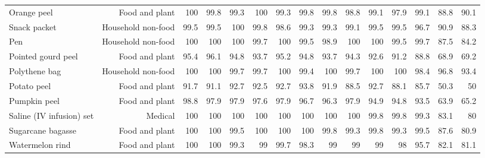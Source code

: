 \begin{table}[!htbp]
\begin{adjustbox}{max width=\textwidth}
\begin{tabular}{@{}lrrrrrrrrrrrrrr@{}}
Orange peel & Food and plant & 100 & 99.8 & 99.3 & 100 & 99.3 & 99.8 & 99.8 & 98.8 & 99.1 & 97.9 & 99.1 & 88.8 & 90.1 \\
Snack packet & Household non-food & 99.5 & 99.5 & 100 & 99.8 & 98.6 & 99.3 & 99.3 & 99.1 & 99.5 & 99.5 & 96.7 & 90.9 & 88.3 \\
Pen & Household non-food & 100 & 100 & 100 & 99.7 & 100 & 99.5 & 98.9 & 100 & 100 & 99.5 & 99.7 & 87.5 & 84.2 \\
Pointed gourd peel & Food and plant & 95.4 & 96.1 & 94.8 & 93.7 & 95.2 & 94.8 & 93.7 & 94.3 & 92.6 & 91.2 & 88.8 & 68.9 & 69.2 \\
Polythene bag & Household non-food & 100 & 100 & 99.7 & 99.7 & 100 & 99.4 & 100 & 99.7 & 100 & 100 & 98.4 & 96.8 & 93.4 \\
Potato peel & Food and plant & 91.7 & 91.1 & 92.7 & 92.5 & 92.7 & 93.8 & 91.9 & 88.5 & 92.7 & 88.1 & 85.7 & 50.3 & 50 \\
Pumpkin peel & Food and plant & 98.8 & 97.9 & 97.9 & 97.6 & 97.9 & 96.7 & 96.3 & 97.9 & 94.9 & 94.8 & 93.5 & 63.9 & 65.2 \\
Saline (IV infusion) set & Medical & 100 & 100 & 100 & 100 & 100 & 100 & 100 & 100 & 99.8 & 99.8 & 99.3 & 83.1 & 80 \\
Sugarcane bagasse & Food and plant & 100 & 100 & 99.5 & 100 & 100 & 100 & 99.8 & 99.3 & 99.8 & 99.3 & 99.5 & 87.6 & 80.9 \\
Watermelon rind & Food and plant & 100 & 100 & 99.3 & 99 & 99.7 & 98.3 & 99 & 99 & 99 & 98 & 95.7 & 82.1 & 81.1 \\
\bottomrule
\end{tabular}
\end{adjustbox}
\end{table}
